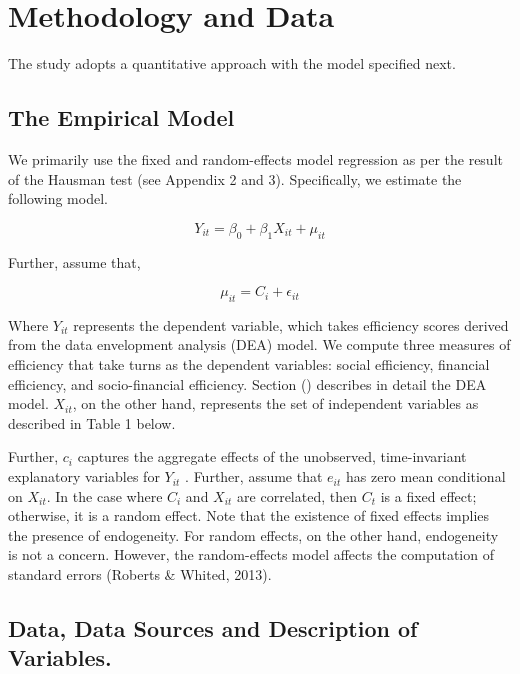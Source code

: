 \documentclass[
]{article}
\begin{document}
\hypertarget{methodology-and-data}{%
\section{Methodology and Data}\label{methodology-and-data}}

The study adopts a quantitative approach with the model specified next.

\hypertarget{the-empirical-model}{%
\subsection{The Empirical Model}\label{the-empirical-model}}

We primarily use the fixed and random-effects model regression as per
the result of the Hausman test (see Appendix 2 and 3). Specifically, we
estimate the following model.

\begin{equation}
Y_{it} = \beta_{0} + \beta_{1}X_{it} + \mu_{it}
\end{equation}

Further, assume that,

\begin{equation}
\mu_{it} = C_{i} + \epsilon_{it}
\end{equation}

Where \(Y_{it}\) represents the dependent variable, which takes
efficiency scores derived from the data envelopment analysis (DEA)
model. We compute three measures of efficiency that take turns as the
dependent variables: social efficiency, financial efficiency, and
socio-financial efficiency. Section () describes in detail the DEA
model. \(X_{it}\), on the other hand, represents the set of independent
variables as described in Table 1 below.

Further, \(c_{i}\) captures the aggregate effects of the unobserved,
time-invariant explanatory variables for \(Y_{it}\) . Further, assume
that \(e_{it}\) has zero mean conditional on \(X_{it}\). In the case
where \(C_{i}\) and \(X_{it}\) are correlated, then \(C_{t}\) is a fixed
effect; otherwise, it is a random effect. Note that the existence of
fixed effects implies the presence of endogeneity. For random effects,
on the other hand, endogeneity is not a concern. However, the
random-effects model affects the computation of standard errors (Roberts
\& Whited, 2013).

\hypertarget{data-data-sources-and-description-of-variables.}{%
\subsection{Data, Data Sources and Description of
Variables.}\label{data-data-sources-and-description-of-variables.}}
\end{document}
